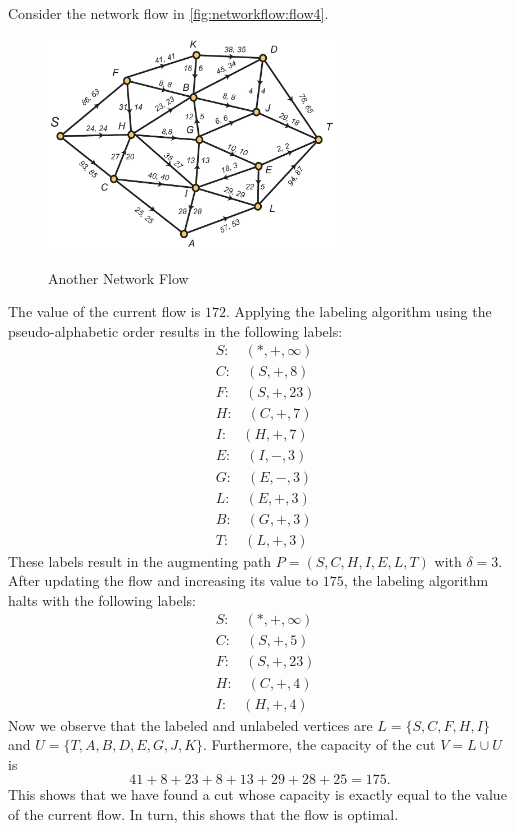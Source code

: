 Consider the network flow in \autoref{fig:networkflow:flow4}.
\begin{figure}
\begin{center}
\includegraphics*[width=3in]{networkflow-figs/network_flow4}\\
\caption{Another Network Flow\label{fig:networkflow:flow4}}
\end{center}
\end{figure}
The value of the current flow is $172$.  Applying the labeling
algorithm using the pseudo-alphabetic order results in the following
labels:
\begin{align*}
  &S:\quad(*,+,\infty)\\
  &C:\quad(S,+,8)\\
  &F:\quad(S,+,23)\\
  &H:\quad(C,+,7)\\
  &I:\quad(H,+,7)\\
  &E:\quad(I,-,3)\\
  &G:\quad(E,-,3)\\
  &L:\quad(E,+,3)\\
  &B:\quad(G,+,3)\\
  &T:\quad(L,+,3)
\end{align*}
These labels result in the augmenting path $P=(S,C,H,I,E,L,T)$ with
$\delta =3$. After updating the flow and increasing its value to
$175$, the labeling algorithm halts with the following labels:
\begin{align*}
  &S:\quad(*,+,\infty)\\
  &C:\quad(S,+,5)\\
  &F:\quad(S,+,23)\\
  &H:\quad(C,+,4)\\
  &I:\quad(H,+,4)
\end{align*}
Now we observe that the labeled and unlabeled vertices are
$L=\{S,C,F,H,I\}$ and $U=\{T,A,B,D,E,G,J,K\}$.  Furthermore, the
capacity of the cut $V=L\cup U$ is
\[
41+8+23+8+13+29+28+25 = 175. 
\]
This shows that we have found a cut whose capacity is exactly equal to
the value of the current flow.  In turn, this shows that the flow is
optimal.

